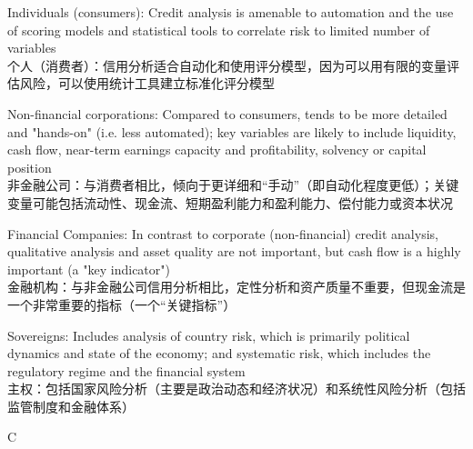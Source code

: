\documentclass{article}
\begin{document}
\begin{choices}
    \item Individuals (consumers): Credit analysis is amenable to automation and the use of scoring models and statistical tools to correlate risk to limited number of variables\\
    个人（消费者）：信用分析适合自动化和使用评分模型，因为可以用有限的变量评估风险，可以使用统计工具建立标准化评分模型
    \item Non-financial corporations: Compared to consumers, tends to be more detailed and "hands-on" (i.e. less automated); key variables are likely to include liquidity, cash flow, near-term earnings capacity and profitability, solvency or capital position\\
    非金融公司：与消费者相比，倾向于更详细和“手动”（即自动化程度更低）；关键变量可能包括流动性、现金流、短期盈利能力和盈利能力、偿付能力或资本状况
    \item Financial Companies: In contrast to corporate (non-financial) credit analysis, qualitative analysis and asset quality are not important, but cash flow is a highly important (a "key indicator")\\
    金融机构：与非金融公司信用分析相比，定性分析和资产质量不重要，但现金流是一个非常重要的指标（一个“关键指标”）
    \item Sovereigns: Includes analysis of country risk, which is primarily political dynamics and state of the economy; and systematic risk, which includes the regulatory regime and the financial system\\
    主权：包括国家风险分析（主要是政治动态和经济状况）和系统性风险分析（包括监管制度和金融体系）
\end{choices}

\begin{correctanswer}
    C
\end{correctanswer}
\end{document}
